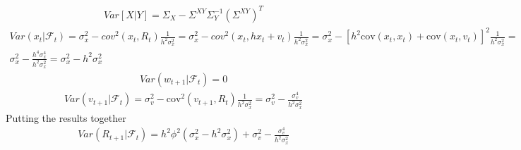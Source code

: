 \begin{gather*}
    Var[X|Y] = \Sigma_{X} - \Sigma^{XY}\Sigma_{Y}^{-1}(\Sigma^{XY})^{T}
\end{gather*}
\begin{gather*}
    Var( x_t| \mathcal{F}_t) = \sigma_x^2 - cov^2(x_t, R_t) \frac{1}{h^2 \sigma_x^2}= \sigma_x^2  - cov^2(x_t, hx_t+v_t) \frac{1}{h^2 \sigma_x^2}= \sigma_x^2  - [h^2 \text{cov}(x_t,x_t)+\text{cov}(x_t,v_t)]^2\frac{1}{h^2\sigma_x^2} =  \\ 
    \sigma_x^2 - \frac{h^4 \sigma_x^4}{h^2 \sigma_x^2}=\sigma_x^2 -h^2\sigma_x^2
\end{gather*}
\begin{gather*}
    Var( w_{t+1}| \mathcal{F}_t)=0
\end{gather*}
\begin{gather*}
    Var( v_{t+1}| \mathcal{F}_t)=\sigma_v^2-\text{cov}^2(v_{t+1},R_t)\frac{1}{h^2\sigma_x^2} = \sigma_v^2 - \frac{\sigma_v^4}{h^2 \sigma_x^2} 
\end{gather*}
Putting the results together
\begin{gather*}
    Var(R_{t+1}|\mathcal{F}_t) = h^2 \phi^2 (\sigma_x^2-h^2\sigma_x^2)+\sigma_v^2-\frac{\sigma_v^4}{h^2 \sigma_x^2}
\end{gather*}